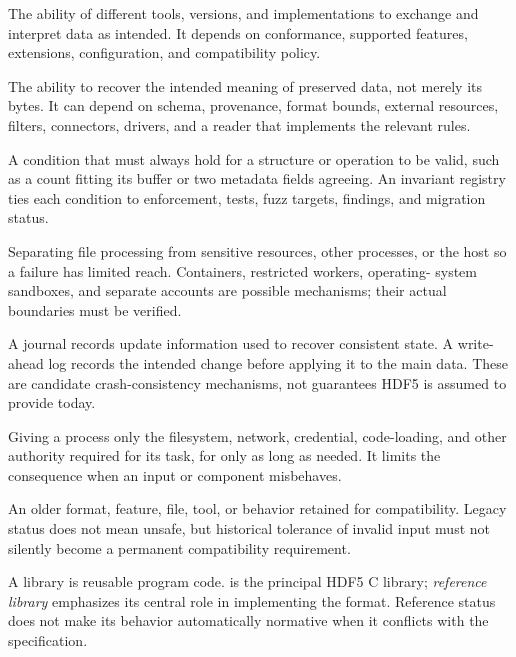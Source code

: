 \documentclass[../main.tex]{subfiles}
\begin{document}
\begin{description}[leftmargin=1.5em,style=nextline]
\item[Interoperability.]
The ability of different tools, versions, and implementations to exchange and
interpret data as intended. It depends on conformance, supported features,
extensions, configuration, and compatibility policy.

\item[Interpretability.]
The ability to recover the intended meaning of preserved data, not merely its
bytes. It can depend on schema, provenance, format bounds, external resources,
filters, connectors, drivers, and a reader that implements the relevant rules.

\item[Invariant.]
A condition that must always hold for a structure or operation to be valid,
such as a count fitting its buffer or two metadata fields agreeing. An
invariant registry ties each condition to enforcement, tests, fuzz targets,
findings, and migration status.

\item[Isolation / process isolation.]
Separating file processing from sensitive resources, other processes, or the
host so a failure has limited reach. Containers, restricted workers, operating-
system sandboxes, and separate accounts are possible mechanisms; their actual
boundaries must be verified.

\item[Journal / write-ahead log.]
A journal records update information used to recover consistent state. A
write-ahead log records the intended change before applying it to the main
data. These are candidate crash-consistency mechanisms, not guarantees HDF5 is
assumed to provide today.

\item[Least privilege.]
Giving a process only the filesystem, network, credential, code-loading, and
other authority required for its task, for only as long as needed. It limits
the consequence when an input or component misbehaves.

\item[Legacy.]
An older format, feature, file, tool, or behavior retained for compatibility.
Legacy status does not mean unsafe, but historical tolerance of invalid input
must not silently become a permanent compatibility requirement.

\item[Library / reference library / \code{libhdf5}.]
A library is reusable program code.  is the principal HDF5 C
library; \emph{reference library} emphasizes its central role in implementing
the format. Reference status does not make its behavior automatically
normative when it conflicts with the specification.


\end{description}
\end{document}
